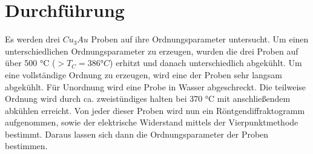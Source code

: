 \section{Durchführung}
    Es werden drei $Cu_3Au$ Proben auf ihre Ordnungsparameter untersucht. Um einen unterschiedlichen Ordnungsparameter
    zu erzeugen, wurden die drei Proben auf über 500 °C ($>T_C = 386 °C$) erhitzt und danach unterschiedlich abgekühlt.
    Um eine vollständige Ordnung zu erzeugen, wird eine der Proben sehr langsam abgekühlt. Für Unordnung wird eine Probe
    in Wasser abgeschreckt. Die teilweise Ordnung wird durch ca. zweistündiges halten bei 370 °C mit anschließendem abkühlen
    erreicht. Von jeder dieser Proben wird nun ein Röntgendiffraktogramm aufgenommen, sowie der elektrische Widerstand 
    mittels der Vierpunktmethode bestimmt. Daraus lassen sich dann die Ordnungsparameter der Proben bestimmen.
